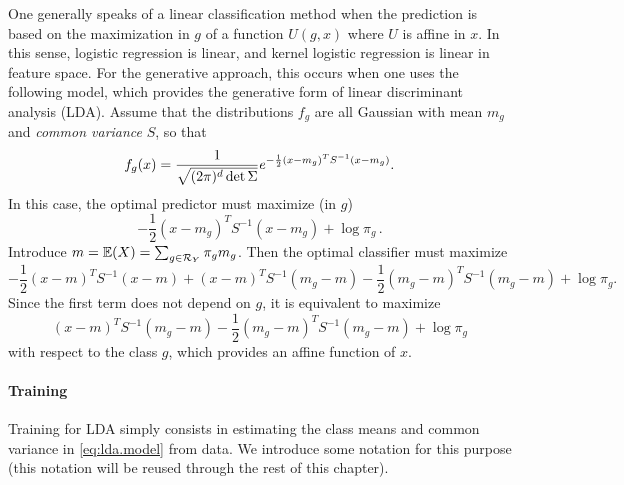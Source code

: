 One generally speaks of a linear classification method when the prediction is based on the maximization in $g$ of a function $U(g,x)$ where $U$ is affine in $x$. In this sense, logistic regression is linear, and kernel logistic regression is linear in feature space. For the generative approach, this occurs when one uses the following model, which provides the generative form of linear discriminant analysis (LDA). Assume that 
the distributions $f_g$ are all Gaussian  with
mean $m_g$ and {\em common variance} $S$, so that
\begin{equation}
\label{eq:lda.model}
f_g(x) = \frac{1}{\sqrt{(2\pi)^d\det \Sigma}} e^{-\frac12 (x-m_g)^T S^{-1}
(x-m_g)}.
\end{equation}
In this case, the optimal predictor must maximize (in $g$)
\[
- \frac12 (x-m_g)^T S^{-1}
(x-m_g) + \log \pi_g\,.
\]
Introduce $m = \bm{\mathbb E}(X) = \sum_{g\in {\mathcal R}_Y} \pi_g m_g$. Then the optimal classifier must maximize
\[
- \frac12 (x-m)^T S^{-1}
(x-m) + (x-m)^T S^{-1}
(m_g-m)  - \frac12 (m_g-m)^T S^{-1}
(m_g-m) + \log \pi_g.
\]
Since the first term does not depend on $g$, it is equivalent to maximize
\begin{equation}
\label{eq:lda.minimize}
(x-m)^T S^{-1}
(m_g-m)  - \frac12 (m_g-m)^T S^{-1}
(m_g-m) + \log \pi_g
\end{equation}
with respect to the class $g$, which provides an affine function of $x$. 


\paragraph{Training}
Training for LDA simply consists in estimating the class means and common variance in \cref{eq:lda.model} from data.
We introduce some notation for this purpose (this notation will be reused through the rest of this chapter). 

